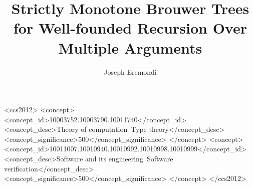 \documentclass[dvipsnames,sigplan,screen]{acmart}
\begin{document}
\title[Strictly Monotone Brouwer Trees]{Strictly Monotone Brouwer Trees for Well-founded Recursion Over Multiple Arguments}


\author{Joseph Eremondi}





\renewcommand{\shortauthors}{Joseph Eremondi}




\begin{abstract}
	
\end{abstract}


\begin{CCSXML}
	<ccs2012>
	<concept>
	<concept_id>10003752.10003790.10011740</concept_id>
	<concept_desc>Theory of computation~Type theory</concept_desc>
	<concept_significance>500</concept_significance>
	</concept>
	<concept>
	<concept_id>10011007.10010940.10010992.10010998.10010999</concept_id>
	<concept_desc>Software and its engineering~Software verification</concept_desc>
	<concept_significance>500</concept_significance>
	</concept>
	</ccs2012>
\end{CCSXML}
\end{document}

